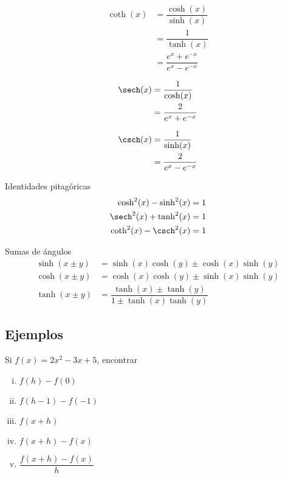 {}
\begin{align*}
\coth(x) &= \dfrac{\cosh(x)}{\sinh(x)}\\ 
& = \dfrac{1}{\tanh(x)}\\ 
& = \dfrac{e^{x}+e^{-x}}{e^{x}-e^{-x}} 
\end{align*}

{}
 \begin{align*}
\sech(x)&= \dfrac{1}{\cosh(x)} \\ 
&= \dfrac{2}{e^{x}+e^{-x}}
\end{align*}

{}
\begin{align*}
\csch(x)&= \dfrac{1}{\sinh(x)} \\ 
&= \dfrac{2}{e^{x}-e^{-x}}
\end{align*}

{Identidades pitagóricas}
\begin{align*}
\cosh^{2}(x)-\sinh^{2}(x)&= 1\\
\sech^{2}(x)+\tanh^{2}(x)&= 1\\
\coth^{2}(x)-\csch^{2}(x)&= 1
\end{align*}

{Sumas de ángulos}
 \begin{align*}
\sinh(x\pm y) &= \sinh(x)\cosh(y)\pm \cosh(x)\sinh(y)\\
\cosh(x\pm y) &= \cosh(x)\cosh(y)\pm \sinh(x)\sinh(y)\\
\tanh(x\pm y) &= \dfrac{\tanh(x)\pm \tanh(y)}{1\pm \tanh(x)\tanh(y)}
\end{align*}

\subsection{Ejemplos}
{}
\begin{problema}
\label{solved 1.4}
Si $f(x)=2x^{2}-3x+5$, encontrar
\begin{enumerate}[(i)]
 \item $f(h)-f(0)$
 
 \item $f(h-1)-f(-1)$
 
 \item $f(x+h)$
 
 \item $f(x+h)-f(x)$
 
 \item $\dfrac{f(x+h)-f(x)}{h}$
\end{enumerate}
\end{problema}



